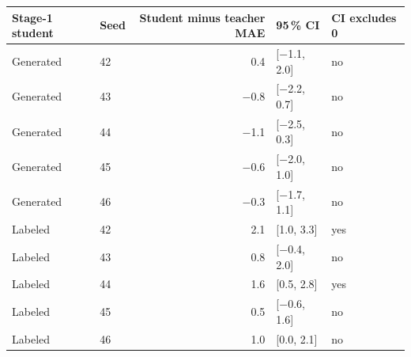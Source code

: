 \begin{tabular}{@{}llrll@{}}
\toprule
Stage-1 student & Seed & Student minus teacher MAE & 95\,\% CI & CI excludes 0 \\
\midrule
Generated & 42 & \num{+0.4} & [\num{-1.1}, \num{+2.0}] & no \\
Generated & 43 & \num{-0.8} & [\num{-2.2}, \num{+0.7}] & no \\
Generated & 44 & \num{-1.1} & [\num{-2.5}, \num{+0.3}] & no \\
Generated & 45 & \num{-0.6} & [\num{-2.0}, \num{+1.0}] & no \\
Generated & 46 & \num{-0.3} & [\num{-1.7}, \num{+1.1}] & no \\
Labeled & 42 & \num{+2.1} & [\num{+1.0}, \num{+3.3}] & yes \\
Labeled & 43 & \num{+0.8} & [\num{-0.4}, \num{+2.0}] & no \\
Labeled & 44 & \num{+1.6} & [\num{+0.5}, \num{+2.8}] & yes \\
Labeled & 45 & \num{+0.5} & [\num{-0.6}, \num{+1.6}] & no \\
Labeled & 46 & \num{+1.0} & [\num{0.0}, \num{+2.1}] & no \\
\bottomrule
\end{tabular}
